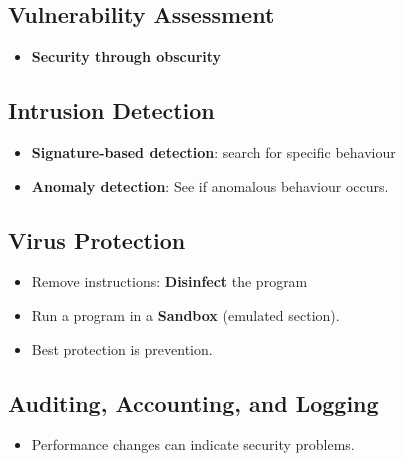 \documentclass[10pt]{report}
\begin{document}
		\subsection{Vulnerability Assessment}
			\begin{itemize}
				\item \textbf{Security through obscurity}
			\end{itemize}

		\subsection{Intrusion Detection}
			\begin{itemize}
				\item \textbf{Signature-based detection}: search for specific behaviour
				\item \textbf{Anomaly detection}: See if anomalous behaviour occurs.
			\end{itemize}

		\subsection{Virus Protection}
			\begin{itemize}
				\item Remove instructions: \textbf{Disinfect} the program
				\item Run a program in a \textbf{Sandbox} (emulated section).
				\item Best protection is prevention.
			\end{itemize}

		\subsection{Auditing, Accounting, and Logging}
			\begin{itemize}
				\item Performance changes can indicate security problems.
			\end{itemize}
\end{document}
